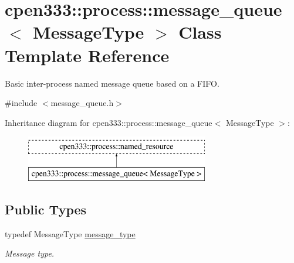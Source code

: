 \hypertarget{classcpen333_1_1process_1_1message__queue}{}\section{cpen333\+:\+:process\+:\+:message\+\_\+queue$<$ Message\+Type $>$ Class Template Reference}
\label{classcpen333_1_1process_1_1message__queue}


Basic inter-\/process named message queue based on a F\+I\+FO.  




{\ttfamily \#include $<$message\+\_\+queue.\+h$>$}

Inheritance diagram for cpen333\+:\+:process\+:\+:message\+\_\+queue$<$ Message\+Type $>$\+:\begin{figure}[H]
\begin{center}
\leavevmode
\includegraphics[height=2.000000cm]{classcpen333_1_1process_1_1message__queue}
\end{center}
\end{figure}
\subsection*{Public Types}
\begin{DoxyCompactItemize}
\item 
\mbox{\label{classcpen333_1_1process_1_1message__queue_a846d3e301643761369a88933f3fb282b}} 
typedef Message\+Type \hyperlink{classcpen333_1_1process_1_1message__queue_a846d3e301643761369a88933f3fb282b}{message\+\_\+type}
\begin{DoxyCompactList}\small\item\em Message type. \end{DoxyCompactList}\end{DoxyCompactItemize}
